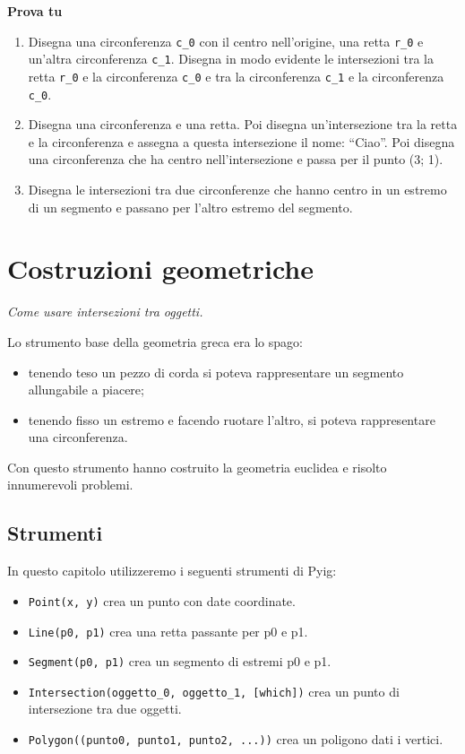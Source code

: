 \textbf{Prova tu}
\begin{enumerate} [noitemsep]
\item Disegna una circonferenza \texttt{c\_0} con il centro nell'origine,
una retta \texttt{r\_0} e un'altra circonferenza \texttt{c\_1}.
Disegna in modo evidente le intersezioni tra la retta \texttt{r\_0} e la
circonferenza \texttt{c\_0} e tra la circonferenza \texttt{c\_1} e la
circonferenza \texttt{c\_0}.

\item Disegna una circonferenza e una retta. Poi disegna un'intersezione tra
la retta e la circonferenza e assegna a questa intersezione il nome:
``Ciao''. Poi disegna una circonferenza che ha centro nell'intersezione
e passa per il punto (3; 1).

\item Disegna le intersezioni tra due circonferenze che hanno centro in un 
estremo di un segmento e passano per l'altro estremo del segmento.

\end{enumerate}


\section{Costruzioni geometriche}
\label{sec:costruzioni}

\emph{Come usare intersezioni tra oggetti.}

Lo strumento base della geometria greca era lo spago:

\begin{itemize} [noitemsep]
\item tenendo teso un pezzo di corda si poteva rappresentare un segmento
allungabile a piacere;
\item tenendo fisso un estremo e facendo ruotare l'altro, si poteva 
rappresentare una circonferenza.
\end{itemize}

Con questo strumento hanno costruito la geometria euclidea e risolto
innumerevoli problemi.

\subsection{Strumenti}

In questo capitolo utilizzeremo i seguenti strumenti di Pyig:

\begin{itemize} [noitemsep]
\item \texttt{Point(x, y)} crea un punto con date coordinate.
\item \texttt{Line(p0, p1)} crea una retta passante per p0 e p1.
\item \texttt{Segment(p0, p1)} crea un segmento di estremi p0 e p1.
\item \texttt{Intersection(oggetto\_0, oggetto\_1, {[}which{]})} crea un 
punto di intersezione tra due oggetti.
\item \texttt{Polygon((punto0, punto1, punto2, ...))} crea un poligono dati 
i vertici.
\end{itemize}

